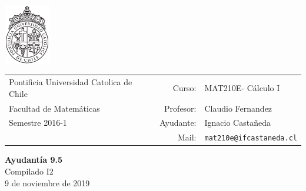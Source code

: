 \documentclass[12pt]{article}
\makeatletter
\newcommand{\ayudantia}{{\sc Ayudantía 9.5}}
\newcommand{\tituloayu}{Compilado I2}
\newcommand{\fecha}{9 de noviembre de 2019}
\newcommand{\sigla}{MAT210E}
\newcommand{\nombre}{Cálculo I}
\newcommand{\profesor}{Claudio Fernandez}
\newcommand{\ano}{2016}
\newcommand{\semestre}{1}
\newcommand{\mail}{mat210e@ifcastaneda.cl}
\makeatother
\begin{document}
\thispagestyle{empty}

\begin{minipage}{2cm}
	\includegraphics[width=2cm]{../../../../img/logo.pdf}
	\vspace{0.5cm}
\end{minipage}
\begin{minipage}{\linewidth}
	\begin{tabular}{lrl}
		{\scriptsize\sc Pontificia Universidad Catolica de Chile} & \hspace*{0.7in}Curso: &
		\sigla  - \nombre\\
		{\sc Facultad de Matemáticas}&
		Profesor: & \profesor \\
		{\sc Semestre \ano-\semestre} & Ayudante: & {Ignacio Castañeda}\\
		& {Mail:} & \texttt{\mail}
	\end{tabular}
\end{minipage}

\vspace{-10mm}
\begin{center}
	{\LARGE\bf \ayudantia}\\
	\vspace{0.1cm}
	{\tituloayu}\\
	\vspace{0.1cm}
	\fecha\\
	\vspace{0.4cm}
\end{center}
\end{document}
